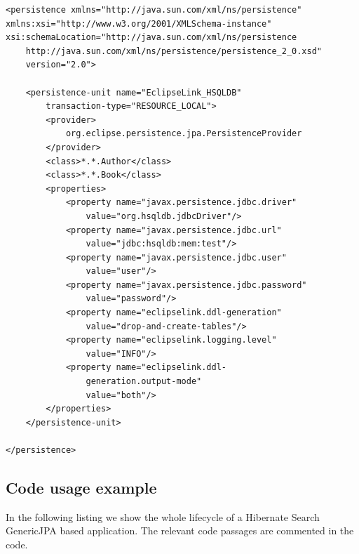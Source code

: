 \lstset{language=xml}
\begin{lstlisting}[frame=htrbl, caption={persistence.xml complete}, label={lst:persistence.xml_complete}]
<persistence xmlns="http://java.sun.com/xml/ns/persistence"
xmlns:xsi="http://www.w3.org/2001/XMLSchema-instance"
xsi:schemaLocation="http://java.sun.com/xml/ns/persistence
	http://java.sun.com/xml/ns/persistence/persistence_2_0.xsd"
	version="2.0">

	<persistence-unit name="EclipseLink_HSQLDB"
		transaction-type="RESOURCE_LOCAL">
		<provider>
			org.eclipse.persistence.jpa.PersistenceProvider
		</provider>
		<class>*.*.Author</class>
		<class>*.*.Book</class>
		<properties>
			<property name="javax.persistence.jdbc.driver"
				value="org.hsqldb.jdbcDriver"/>
			<property name="javax.persistence.jdbc.url"
				value="jdbc:hsqldb:mem:test"/>
			<property name="javax.persistence.jdbc.user"
				value="user"/>
			<property name="javax.persistence.jdbc.password"
				value="password"/>
			<property name="eclipselink.ddl-generation"
				value="drop-and-create-tables"/>
			<property name="eclipselink.logging.level"
				value="INFO"/>
			<property name="eclipselink.ddl-
				generation.output-mode"
				value="both"/>
		</properties>
	</persistence-unit>
	
</persistence>
\end{lstlisting}

\pagebreak

\subsection{Code usage example}

In the following listing we show the whole lifecycle of a Hibernate Search GenericJPA based application. The relevant code passages are commented in the code.
\\

